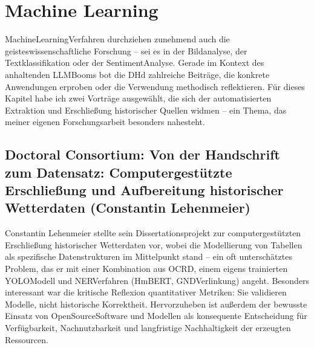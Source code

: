 \documentclass[letterpaper,10pt,english]{jupyterBook}
\begin{document}
\chapter{Machine Learning}
\label{\detokenize{tagung/machine-learning:machine-learning}}\label{\detokenize{tagung/machine-learning::doc}}
\sphinxAtStartPar
Machine\sphinxhyphen{}Learning\sphinxhyphen{}Verfahren durchziehen zunehmend auch die geisteswissenschaftliche Forschung – sei es in der Bildanalyse, der Textklassifikation oder der Sentiment\sphinxhyphen{}Analyse. Gerade im Kontext des anhaltenden LLM\sphinxhyphen{}Booms bot die DHd zahlreiche Beiträge, die konkrete Anwendungen erproben oder die Verwendung methodisch reflektieren. Für dieses Kapitel habe ich zwei Vorträge ausgewählt, die sich der automatisierten Extraktion und Erschließung historischer Quellen widmen – ein Thema, das meiner eigenen Forschungsarbeit besonders nahesteht.


\section{Doctoral Consortium: Von der Handschrift zum Datensatz: Computergestützte Erschließung und Aufbereitung historischer Wetterdaten (Constantin Lehenmeier)}
\label{\detokenize{tagung/machine-learning:doctoral-consortium-von-der-handschrift-zum-datensatz-computergestutzte-erschlieszung-und-aufbereitung-historischer-wetterdaten-constantin-lehenmeier}}
\sphinxAtStartPar
Constantin Lehenmeier stellte sein Dissertationsprojekt zur computergestützten Erschließung historischer Wetterdaten vor, wobei die Modellierung von Tabellen als spezifische Datenstrukturen im Mittelpunkt stand – ein oft unterschätztes Problem, das er mit einer Kombination aus OCR\sphinxhyphen{}D, einem eigens trainierten YOLO\sphinxhyphen{}Modell und NER\sphinxhyphen{}Verfahren (HmBERT, GND\sphinxhyphen{}Verlinkung) angeht. Besonders interessant war die kritische Reflexion quantitativer Metriken: Sie validieren Modelle, nicht historische Korrektheit. Hervorzuheben ist außerdem der bewusste Einsatz von Open\sphinxhyphen{}Source\sphinxhyphen{}Software und \sphinxhyphen{}Modellen als konsequente Entscheidung für Verfügbarkeit, Nachnutzbarkeit und langfristige Nachhaltigkeit der erzeugten Ressourcen.
\end{document}
